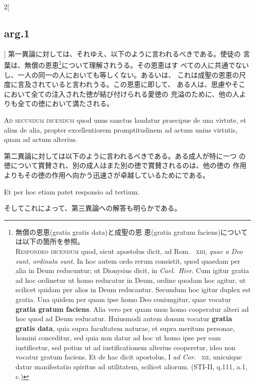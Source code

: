 \documentclass[paper=a4paper,fontsize=10pt,jafontsize=9pt,titlepage]{jlreq}
\begin{document}
\begin{paracol}{2}[\subsection{arg.1}]
第一異論に対しては、それゆえ、以下のように言われるべきである。使徒の
 言葉は、無償の恩恵\footnote{無償の恩恵(gratia gratis data)と成聖の恩
 恵(gratia gratum faciens)については以下の箇所を参照。\\{\scshape
 Respondeo dicendum} quod, sicut apostolus dicit, ad Rom.~{\scshape
 xiii}, {\itshape quae a Deo sunt, ordinata sunt}. In hoc autem ordo
 rerum consistit, quod quaedam per alia in Deum reducuntur; ut
 Dionysius dicit, in {\itshape Cael.~Hier}. Cum igitur gratia ad hoc
 ordinetur ut homo reducatur in Deum, ordine quodam hoc agitur, ut
 scilicet quidam per alios in Deum reducantur. Secundum hoc igitur
 duplex est gratia. Una quidem per quam ipse homo Deo coniungitur,
 quae vocatur {\bfseries gratia gratum faciens}. Alia vero per quam
 unus homo cooperatur alteri ad hoc quod ad Deum reducatur. Huiusmodi
 autem donum vocatur {\bfseries gratia gratis data}, quia supra
 facultatem naturae, et supra meritum personae, homini conceditur, sed
 quia non datur ad hoc ut homo ipse per eam iustificetur, sed potius
 ut ad iustificationem alterius cooperetur, ideo non vocatur gratum
 faciens. Et de hac dicit apostolus, I {\itshape ad Cor}.~{\scshape
 xii}, unicuique datur manifestatio spiritus ad utilitatem, scilicet
 aliorum. (STI-II, q.111, a.1, c.)}について理解されうる。その恩恵はす
 べての人に共通でないし、一人の同一の人においても等しくない。あるいは、
 これは成聖の恩恵の尺度に言及されていると言われうる。この恩恵に即して、
 ある人は、思慮やそこにおいて全ての注入された徳が結び付けられる愛徳の
 充溢のために、他の人よりも全ての徳において満たされる。

\switchcolumn*[\subsection{ad.2}]

{\scshape Ad secundum dicendum} quod unus sanctus laudatur praecipue
de una virtute, et alius de alia, propter excellentiorem
promptitudinem ad actum unius virtutis, quam ad actum alterius.

\switchcolumn

第二異論に対しては以下のように言われるべきである。ある成人が特に一つ
 の徳について賞賛され、別の成人はまた別の徳で賞賛されるのは、他の徳の
 作用よりもその徳の作用へ向かう迅速さが卓越しているためにである。

\switchcolumn*[\subsection{ad.3}]

Et per hoc etiam patet responsio ad tertium.

\switchcolumn

そしてこれによって、第三異論への解答も明らかである。

\end{paracol}
\newpage
{}
{}
\setcounter{section}{3}
\setcounter{subsection}{0}
\end{document}
